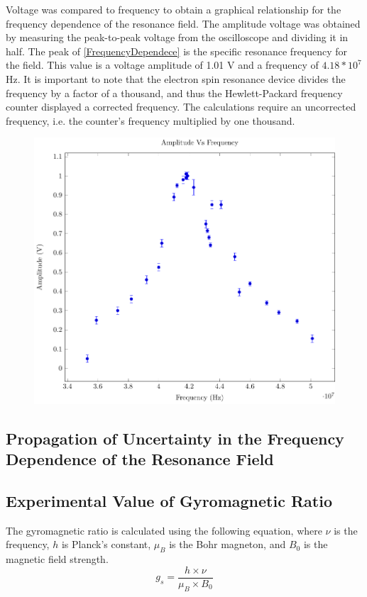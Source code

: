 \documentclass[a4paper]{article}
\begin{document}
\qq Voltage was compared to frequency to obtain a graphical
relationship for the frequency dependence of the resonance field. The
amplitude voltage was obtained by measuring the peak-to-peak voltage
from the oscilloscope and dividing it in half. The peak of
\ref{FrequencyDependece} is the specific resonance frequency for the
field. This value is a voltage amplitude of 1.01 V and a frequency of $4.18*10^7$ Hz. It is important to note that the electron spin resonance device
divides the frequency by a factor of a thousand, and thus the
Hewlett-Packard frequency counter displayed a corrected frequency. The
calculations require an uncorrected frequency, i.e. the counter's
frequency multiplied by one thousand.
\begin{figure}[H]
\centering
\includegraphics[scale=1.0]{Plots/ExpFreqVsVolt/freq_depen.pdf}
\label{FrequencyDependence}
\end{figure}

\subsection{Propagation of Uncertainty in the Frequency Dependence of the Resonance Field}

\subsection{Experimental Value of Gyromagnetic Ratio}
\qq The gyromagnetic ratio is calculated using the following equation, where $\nu$ is the frequency, $h$ is Planck's constant, $\mu_B$ is the Bohr magneton, and $B_0$ is the magnetic field strength.
\begin{equation}
\label{eq:exp_gs}
g_s = \frac{h \times \nu}{\mu_B \times B_0}
\end{equation} 
\end{document}
